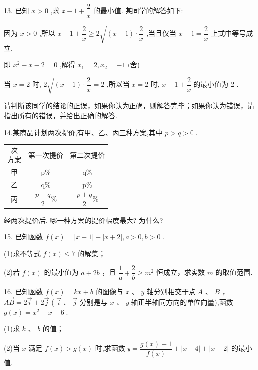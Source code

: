 13. 已知 $x > 0$ ,求 $x - 1 + \dfrac{2}{x}$ 的最小值. 某同学的解答如下:

因为 $x > 0$ ,所以 $x - 1 + \dfrac{2}{x} \geq  2\sqrt{\left( {x - 1}\right)  \cdot  \dfrac{2}{x}}$ ,当且仅当 $x - 1 = \dfrac{2}{x}$ 上式中等号成立,

即 ${x}^{2} - x - 2 = 0$ ,解得 ${x}_{1} = 2,{x}_{2} =  - 1$ (舍)

当 $x = 2$ 时, $2\sqrt{\left( {x - 1}\right)  \cdot  \dfrac{2}{x}} = 2$ ,所以当 $x = 2$ 时, $x - 1 + \dfrac{2}{x}$ 的最小值为 2 .

请判断该同学的结论的正误，如果你认为正确，则解答完毕；如果你认为错误，请指出所有的错误，并给出正确的解答.

14.某商品计划两次提价,有甲、乙、丙三种方案,其中 $p > q > 0$ .

\begin{center}
\begin{tabular}{|c|c|c|}
\hline
\makecell{ 次 \\ 方案 } & 第一次提价 & 第二次提价 \\
\cline{1-3}
甲 & p\% & q\% \\
\cline{1-3}
乙 & q\% & p\% \\
\cline{1-3}
丙 & $\dfrac{p + q}{2}\%$ & $\dfrac{p + q}{2}\%$ \\
\cline{1-3}
\hline
\end{tabular}
\end{center}

经两次提价后, 哪一种方案的提价幅度最大? 为什么?

15. 已知函数 $f\left( x\right)  = \left| {x - 1}\right|  + \left| {x + 2}\right| ,a > 0,b > 0$ .

(1)求不等式 $f\left( x\right)  \leq  7$ 的解集；

(2)若 $f\left( x\right)$ 的最小值为 $a + {2b}$ ，且 $\dfrac{1}{a} + \dfrac{2}{b} \geq  {m}^{2}$ 恒成立，求实数 $m$ 的取值范围.

16. 已知函数 $f\left( x\right)  = {kx} + b$ 的图像与 $x$ 、 $y$ 轴分别相交于点 $A$ 、 $B$ ， $\overrightarrow{AB} = 2\overrightarrow{i} + 2\overrightarrow{j}$ ( $\overrightarrow{i}$ 、 $\overrightarrow{j}$ 分别是与 $x$ 、 $y$ 轴正半轴同方向的单位向量),函数 $g\left( x\right)  = {x}^{2} - x - 6$ .

(1)求 $k$ 、 $b$ 的值；

(2)当 $x$ 满足 $f\left( x\right)  > g\left( x\right)$ 时,求函数 $y = \dfrac{g\left( x\right)  + 1}{f\left( x\right) } + \left| {x - 4}\right|  + \left| {x + 2}\right|$ 的最小值.

